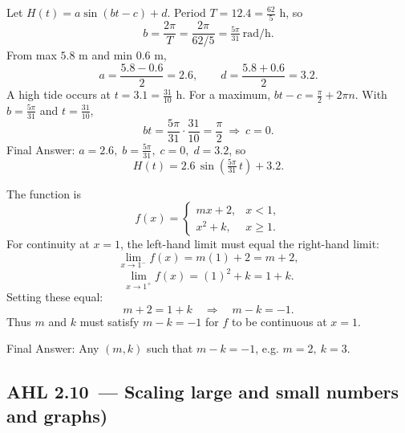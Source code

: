 \documentclass[11pt]{article}
\def\textbf#1{#1}%
\newcommand{\tocsubsection}[1]{\subsection{#1}}
\begin{document}
\begin{solution}
Let \(H(t)=a\sin(bt-c)+d\).
Period \(T=12.4=\tfrac{62}{5}\) h, so
\[
b=\frac{2\pi}{T}=\frac{2\pi}{62/5}=\boxed{\tfrac{5\pi}{31}}\ \text{rad/h}.
\]
From max \(5.8\) m and min \(0.6\) m,
\[
a=\frac{5.8-0.6}{2}=\boxed{2.6},\qquad
d=\frac{5.8+0.6}{2}=\boxed{3.2}.
\]
A high tide occurs at \(t=3.1=\tfrac{31}{10}\) h. For a maximum, \(bt-c=\frac{\pi}{2}+2\pi n\).
With \(b=\tfrac{5\pi}{31}\) and \(t=\tfrac{31}{10}\),
\[
bt=\frac{5\pi}{31}\cdot\frac{31}{10}=\frac{\pi}{2}\ \Rightarrow\ c=\boxed{0}.
\]
\textbf{Final Answer:} \(\boxed{a=2.6,\; b=\tfrac{5\pi}{31},\; c=0,\; d=3.2}\), so
\[
\boxed{H(t)=2.6\,\sin\!\left(\tfrac{5\pi}{31}\,t\right)+3.2}.
\]
\end{solution}

\begin{solution}
The function is
\[
f(x) =
\begin{cases}
mx + 2, & x < 1,\\
x^2 + k, & x \ge 1.
\end{cases}
\]
For continuity at \(x=1\), the left-hand limit must equal the right-hand limit:
\[
\lim_{x\to 1^-} f(x) = m(1) + 2 = m + 2,
\]
\[
\lim_{x\to 1^+} f(x) = (1)^2 + k = 1 + k.
\]
Setting these equal:
\[
m + 2 = 1 + k \quad\Rightarrow\quad m - k = -1.
\]
Thus \(m\) and \(k\) must satisfy \(\boxed{m - k = -1}\) for \(f\) to be continuous at \(x=1\).

\textbf{Final Answer:} Any \((m,k)\) such that \(m - k = -1\), e.g. \(\boxed{m=2,\ k=3}\).
\end{solution}

\tocsubsection{AHL 2.10 — Scaling large and small numbers and graphs)}


\end{document}

